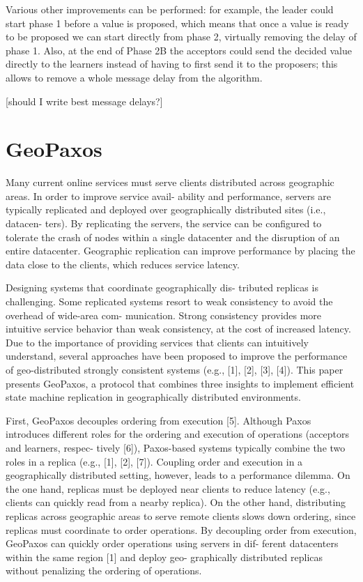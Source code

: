 Various other improvements can be performed: for example, the leader could start phase 1 before a value is proposed, which means that once a value is ready to be proposed we can start directly from phase 2, virtually removing the delay of phase 1.
Also, at the end of Phase 2B the acceptors could send the decided value directly to the learners instead of having to first send it to the proposers; this allows to remove a whole message delay from the algorithm.

[should I write best message delays?]

\section{GeoPaxos}\label{sec:GeoPaxos}


Many current online services must serve clients distributed across geographic areas. In order to improve service avail- ability and performance, servers are typically replicated and deployed over geographically distributed sites (i.e., datacen- ters). By replicating the servers, the service can be configured to tolerate the crash of nodes within a single datacenter and the disruption of an entire datacenter. Geographic replication can improve performance by placing the data close to the clients, which reduces service latency.

Designing systems that coordinate geographically dis- tributed replicas is challenging. Some replicated systems resort to weak consistency to avoid the overhead of wide-area com- munication. Strong consistency provides more intuitive service behavior than weak consistency, at the cost of increased latency. Due to the importance of providing services that clients can intuitively understand, several approaches have been proposed to improve the performance of geo-distributed strongly consistent systems (e.g., [1], [2], [3], [4]). This paper presents GeoPaxos, a protocol that combines three insights to implement efficient state machine replication in geographically distributed environments.

First, GeoPaxos decouples ordering from execution [5]. Although Paxos introduces different roles for the ordering and execution of operations (acceptors and learners, respec- tively [6]), Paxos-based systems typically combine the two roles in a replica (e.g., [1], [2], [7]). Coupling order and execution in a geographically distributed setting, however, leads to a performance dilemma. On the one hand, replicas must be deployed near clients to reduce latency (e.g., clients can quickly read from a nearby replica). On the other hand, distributing replicas across geographic areas to serve remote clients slows down ordering, since replicas must coordinate to order operations. By decoupling order from execution, GeoPaxos can quickly order operations using servers in dif- ferent datacenters within the same region [1] and deploy geo- graphically distributed replicas without penalizing the ordering of operations.

